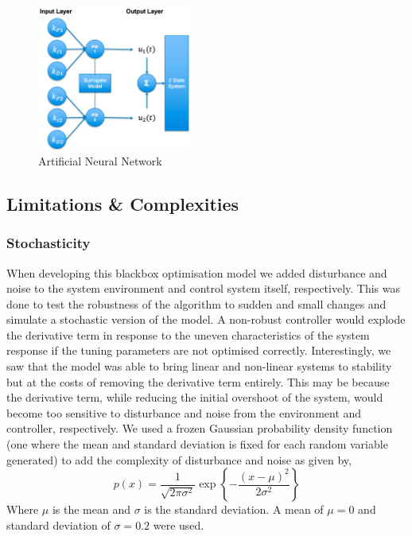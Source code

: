 \documentclass[conference]{IEEEtran}
\theoremstyle{definition}
\begin{document}
\begin{figure}
    \centering
    \includegraphics[width=0.45\textwidth]{NN.png}
    \caption{Artificial Neural Network}
    \label{fig:my_label}
\end{figure}

\subsection{Limitations \& Complexities}
\subsubsection{Stochasticity}
\noindent When developing this blackbox optimisation model we added disturbance and noise to the system environment and control system itself, respectively. This was done to test the robustness of the algorithm to sudden and small changes and simulate a stochastic version of the model. A non-robust controller would explode the derivative term in response to the uneven characteristics of the system response if the tuning parameters are not optimised correctly. Interestingly, we saw that the model was able to bring linear and non-linear systems to stability but at the costs of removing the derivative term entirely. This may be because the derivative term, while reducing the initial overshoot of the system, would become too sensitive to disturbance and noise from the environment and controller, respectively. We used a frozen Gaussian probability density function (one where the mean and standard deviation is fixed for each random variable generated) to add the complexity of disturbance and noise as given by,
\begin{equation}
    p(x) = \frac{1}{\sqrt{2\pi \sigma^2}} \exp{\left\{-\frac{ (x-\mu)^2}{2\sigma^2} \right\}}
\end{equation}
\vspace{1mm}
\noindent Where $\mu$ is the mean and $\sigma$ is the standard deviation. A mean of $\mu=0$ and standard deviation of $\sigma=0.2$ were used. 
\end{document}
